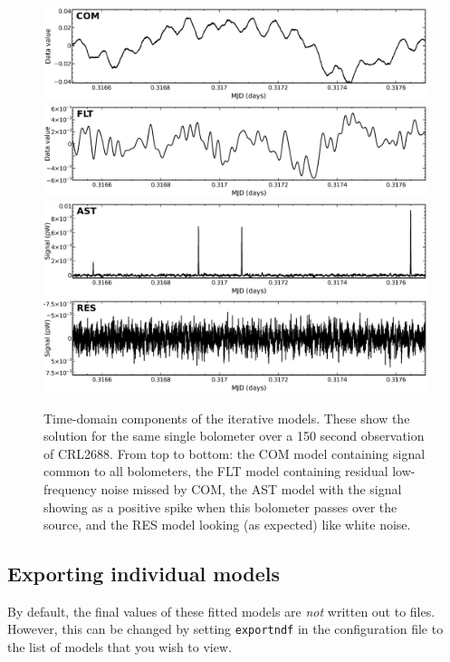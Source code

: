 \documentclass[twoside,11pt]{article}
\newcommand{\xlabel}[1]{}
\renewcommand{\_}{\texttt{\symbol{95}}}
\begin{document}
\begin{figure}
\begin{center}
\includegraphics[width=\linewidth]{com} \\
\includegraphics[width=\linewidth]{flt} \\
\includegraphics[width=\linewidth]{ast} \\
\includegraphics[width=\linewidth]{res} \\
\caption{Time-domain components of the iterative models. These show the solution for the same single bolometer over a 150 second observation of CRL2688. From top to bottom: the COM model containing signal common to all bolometers, the FLT model containing residual low-frequency noise missed by COM, the AST model with the signal showing as a positive spike when this bolometer passes over the source, and the RES model looking (as expected) like white noise. }
\label{fig:itercomp}
\end{center}
\end{figure}





\subsection{\xlabel{export}Exporting individual models}
\label{sec:export}
By default, the final values of these fitted models are {\em not} written out to files. However, this can be changed by setting \texttt{exportndf} in the configuration file to the list of models that you wish to view. 
\end{document}
